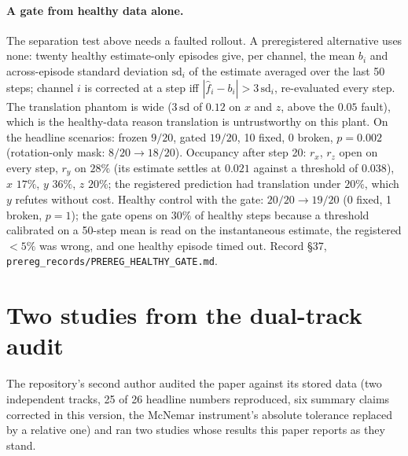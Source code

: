 \documentclass{article}
\newcommand{\code}[1]{\texttt{\small #1}}
\begin{document}
\paragraph{A gate from healthy data alone.} The separation test above needs a faulted rollout.
A preregistered alternative uses none: twenty healthy estimate-only episodes give, per channel,
the mean $b_i$ and across-episode standard deviation $\mathrm{sd}_i$ of the estimate averaged
over the last 50 steps; channel $i$ is corrected at a step iff $|\hat f_i-b_i|>3\,\mathrm{sd}_i$,
re-evaluated every step. The translation phantom is wide ($3\,\mathrm{sd}$ of $0.12$ on $x$ and
$z$, above the $0.05$ fault), which is the healthy-data reason translation is untrustworthy on
this plant. On the headline scenarios: frozen $9/20$, gated $19/20$, 10 fixed, 0 broken,
$p=0.002$ (rotation-only mask: $8/20\to18/20$). Occupancy after step 20: $r_x$, $r_z$ open on
every step, $r_y$ on $28\%$ (its estimate settles at $0.021$ against a threshold of $0.038$),
$x$ $17\%$, $y$ $36\%$, $z$ $20\%$; the registered prediction had translation under $20\%$,
which $y$ refutes without cost. Healthy control with the gate: $20/20\to19/20$ (0 fixed, 1
broken, $p=1$); the gate opens on $30\%$ of healthy steps because a threshold calibrated on a
50-step mean is read on the instantaneous estimate, the registered $<5\%$ was wrong, and one
healthy episode timed out. Record \S37, \code{prereg\_records/PREREG\_HEALTHY\_GATE.md}.

\section{Two studies from the dual-track audit}
\label{app:collab}
The repository's second author audited the paper against its stored data (two independent
tracks, 25 of 26 headline numbers reproduced, six summary claims corrected in this version,
the McNemar instrument's absolute tolerance replaced by a relative one) and ran two studies
whose results this paper reports as they stand.
\end{document}
